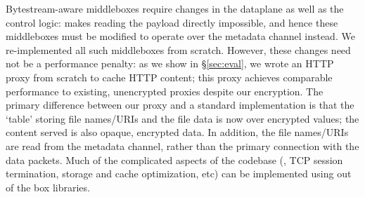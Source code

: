 Bytestream-aware middleboxes require changes in the dataplane as well as the control logic: \sys makes reading the payload directly impossible, and hence these middleboxes must be modified to operate over the metadata channel instead.
We re-implemented all such middleboxes from scratch.
However, these changes need not be a performance penalty: as we show in \S\ref{sec:eval}, we wrote an HTTP proxy from scratch to cache HTTP content; this proxy achieves comparable performance to existing, unencrypted proxies despite our encryption.
The primary difference between our proxy and a standard implementation is that the `table' storing file names/URIs and the file data is now over encrypted values; the content served is also opaque, encrypted data. 
In addition, the file names/URIs are read from the metadata channel, rather than the primary connection with the data packets. 
Much of the complicated aspects of the codebase (\eg{}, TCP session termination, storage and cache optimization, etc) can be implemented using out of the box libraries.

